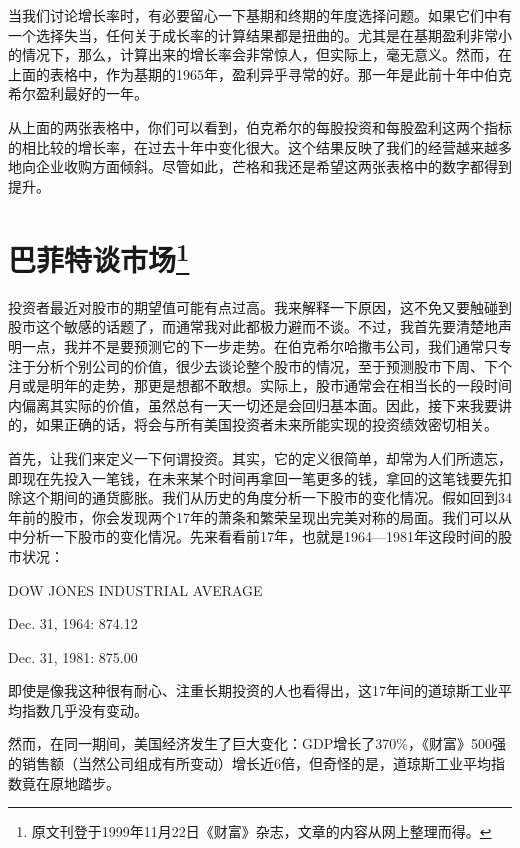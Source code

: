 \documentclass[UTF8,a4paper,zihao=-4,fontset = windows]{ctexart} %
\begin{document}
当我们讨论增长率时，有必要留心一下基期和终期的年度选择问题。如果它们中有一个选择失当，任何关于成长率的计算结果都是扭曲的。尤其是在基期盈利非常小的情况下，那么，计算出来的增长率会非常惊人，但实际上，毫无意义。然而，在上面的表格中，作为基期的1965年，盈利异乎寻常的好。那一年是此前十年中伯克希尔盈利最好的一年。

从上面的两张表格中，你们可以看到，伯克希尔的每股投资和每股盈利这两个指标的相比较的增长率，在过去十年中变化很大。这个结果反映了我们的经营越来越多地向企业收购方面倾斜。尽管如此，芒格和我还是希望这两张表格中的数字都得到提升。

\section[巴菲特谈市场]{巴菲特谈市场\footnote{原文刊登于1999年11月22日《财富》杂志，文章的内容从网上整理而得。}}

投资者最近对股市的期望值可能有点过高。我来解释一下原因，这不免又要触碰到股市这个敏感的话题了，而通常我对此都极力避而不谈。不过，我首先要清楚地声明一点，我并不是要预测它的下一步走势。在伯克希尔哈撒韦公司，我们通常只专注于分析个别公司的价值，很少去谈论整个股市的情况，至于预测股市下周、下个月或是明年的走势，那更是想都不敢想。实际上，股市通常会在相当长的一段时间内偏离其实际的价值，虽然总有一天一切还是会回归基本面。因此，接下来我要讲的，如果正确的话，将会与所有美国投资者未来所能实现的投资绩效密切相关。

首先，让我们来定义一下何谓投资。其实，它的定义很简单，却常为人们所遗忘，即现在先投入一笔钱，在未来某个时间再拿回一笔更多的钱，拿回的这笔钱要先扣除这个期间的通货膨胀。我们从历史的角度分析一下股市的变化情况。假如回到34年前的股市，你会发现两个17年的萧条和繁荣呈现出完美对称的局面。我们可以从中分析一下股市的变化情况。先来看看前17年，也就是1964—1981年这段时间的股市状况：

DOW JONES INDUSTRIAL AVERAGE

Dec. 31, 1964: 874.12

Dec. 31, 1981: 875.00

即使是像我这种很有耐心、注重长期投资的人也看得出，这17年间的道琼斯工业平均指数几乎没有变动。

然而，在同一期间，美国经济发生了巨大变化：GDP增长了370\%，《财富》500强的销售额（当然公司组成有所变动）增长近6倍，但奇怪的是，道琼斯工业平均指数竟在原地踏步。
\end{document}
